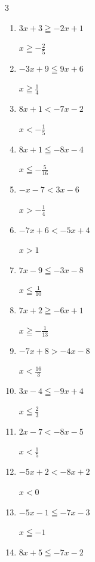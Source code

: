 \begin{multicols}{3}
\begin{enumerate}
        $\displaystyle x<-13$

  \item $3x+3\geqq -2x+1$

        $\displaystyle x\geqq -\frac{2}{5}$

  \item $-3x+9\leqq 9x+6$

        $\displaystyle x\geqq \frac{1}{4}$

  \item $8x+1<-7x-2$

        $\displaystyle x<-\frac{1}{5}$

  \item $8x+1\leqq -8x-4$

        $\displaystyle x\leqq -\frac{5}{16}$

  \item $-x-7<3x-6$

        $\displaystyle x>-\frac{1}{4}$

  \item $-7x+6<-5x+4$

        $\displaystyle x>1$

  \item $7x-9\leqq -3x-8$

        $\displaystyle x\leqq \frac{1}{10}$

  \item $7x+2\geqq -6x+1$

        $\displaystyle x\geqq -\frac{1}{13}$

  \item $-7x+8>-4x-8$

        $\displaystyle x<\frac{16}{3}$

  \item $3x-4\leqq -9x+4$

        $\displaystyle x\leqq \frac{2}{3}$

  \item $2x-7<-8x-5$

        $\displaystyle x<\frac{1}{5}$

\columnbreak %

  \item $-5x+2<-8x+2$

        $\displaystyle x<0$

  \item $-5x-1\leqq -7x-3$

        $\displaystyle x\leqq -1$

  \item $8x+5\leqq -7x-2$


\end{enumerate}
\end{multicols}
